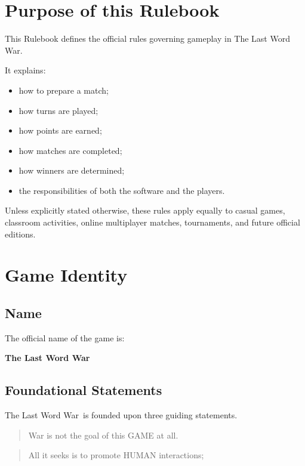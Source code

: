 \documentclass[11pt,a4paper]{article}
\begin{document}
\section{Purpose of this Rulebook}

This Rulebook defines the official rules governing gameplay in The Last Word War\texttrademark.

It explains:

\begin{itemize}
    \item how to prepare a match;
    \item how turns are played;
    \item how points are earned;
    \item how matches are completed;
    \item how winners are determined;
    \item the responsibilities of both the software and the players.
\end{itemize}

Unless explicitly stated otherwise, these rules apply equally to casual games, classroom activities, online multiplayer matches, tournaments, and future official editions.

\section{Game Identity}

\subsection{Name}

The official name of the game is:

\begin{center}
\Large\textbf{The Last Word War\texttrademark}
\end{center}

\subsection{Foundational Statements}

The Last Word War\texttrademark\ is founded upon three guiding statements.

\begin{quote}
War is not the goal of this GAME at all.
\end{quote}

\begin{quote}
All it seeks is to promote HUMAN interactions;
\end{quote}
\end{document}
